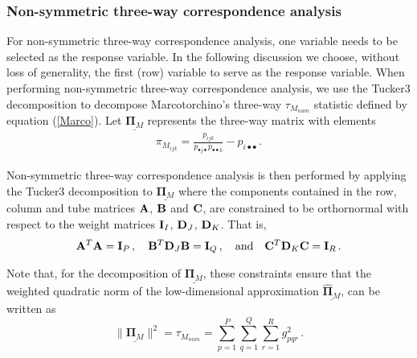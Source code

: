 \subsubsection{Non-symmetric three-way correspondence analysis}
For non-symmetric three-way correspondence analysis, one variable needs to be selected as the response variable. In the following discussion we choose, without loss of generality, the first (row) variable to serve as the response variable. When performing  non-symmetric three-way correspondence analysis, we use the Tucker3 decomposition to decompose  Marcotorchino's three-way $\tau_{M_{num}}$ statistic defined by equation (\ref{Marco}).  Let $\underline{\bm{\Pi}_{M}}$ represents the three-way matrix with elements 
\begin{eqnarray}
	\label{eq:PiM}
	\pi_{M_{ijk}} = \frac{p_{ijk }}{p_{\bullet j\bullet }p_{\bullet \bullet k}}-p_{i \bullet \bullet } \,.
\end{eqnarray}

Non-symmetric three-way correspondence analysis is then performed by applying the Tucker3 decomposition to $\underline{\bm{\Pi}_{M}}$ where the components contained in the row, column and tube matrices ${\bf A}$, ${\bf B}$ and ${\bf C}$, are constrained to be orthornormal with respect to the weight matrices ${\bf I}_I$, ${\bf D}_J$, ${\bf D}_K$. That is, 
 \[
\mathbf{A}^T \mathbf{A} = \mathbf{I}_P\,, \hskip1em \mathbf{B}^T\mathbf{D}_J  \mathbf{B} = \mathbf{I}_Q \,, \hskip1em \text{and}\hskip1em \mathbf{C}^T\mathbf{D}_K  \mathbf{C} = \mathbf{I}_R \,.
\]

Note that, for the decomposition of $\underline{\bm{\Pi}_{M}}$, these constraints 
ensure that the weighted quadratic norm of the low-dimensional approximation $\underline{\widehat{\bm \Pi}_M}$, can be written as
\[
\| {\underline{\widehat{\bm \Pi}_M}}\|^{2} = \tau_{M_{num}} =  \sum_{p=1}^P \sum_{q=1}^Q \sum_{r=1}^R g^2_{pqr} \,.
\]




